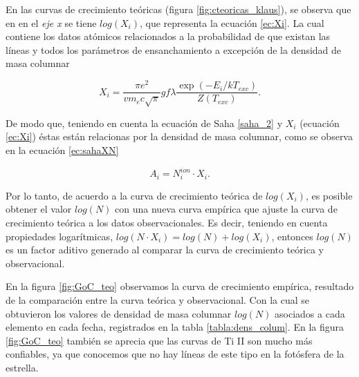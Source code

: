 \documentclass[12pt,oneside,openany,letter]{book}
\begin{document}
En las curvas de crecimiento teóricas (figura \ref{fig:cteoricas_klaus}), se observa que en en el \textit{eje x} se tiene $log(X_i)$, que representa la ecuación \ref{ec:Xi}. La cual contiene los datos atómicos relacionados a la probabilidad de que existan las líneas y todos los parámetros de ensanchamiento a excepción de la densidad de masa columnar

\begin{equation}
    X_{i}= \frac{\pi e^{2}}{vm_{e} c\sqrt{\pi}} g f \lambda \frac{\exp \left(-E_{i} / k T_{exc}\right)}{Z(T_{exc})}.
    \label{ec:Xi}
\end{equation}

De modo que, teniendo en cuenta la ecuación de Saha \ref{saha_2} y $X_i$ (ecuación \ref{ec:Xi}) éstas están relacionas por la densidad de masa columnar, como se observa en la ecuación \ref{ec:sahaXN}

\begin{equation}
    A_i =  N_i^{ion} \cdot X_i.
    \label{ec:sahaXN}
\end{equation}

Por lo tanto, de acuerdo a la curva de crecimiento teórica de $log(X_i)$, es posible obtener el valor $log(N)$ con una nueva curva empírica que ajuste la curva de crecimiento teórica a los datos observacionales. Es decir, teniendo en cuenta propiedades logarítmicas, $log(N\cdot X_i) = log(N) + log(X_i)$, entonces $log(N)$ es un factor aditivo generado al comparar la curva de crecimiento teórica y observacional.

En la figura \ref{fig:GoC_teo} observamos la curva de crecimiento empírica, resultado de la comparación entre la curva teórica y observacional. Con la cual se obtuvieron los valores de densidad de masa columnar $log(N)$ asociados a cada elemento en cada fecha, registrados en la tabla \ref{tabla:dens_colum}. En la figura \ref{fig:GoC_teo} también se aprecia que las curvas de Ti II son mucho más confiables, ya que conocemos que no hay líneas de este tipo en la fotósfera de la estrella.
\end{document}
